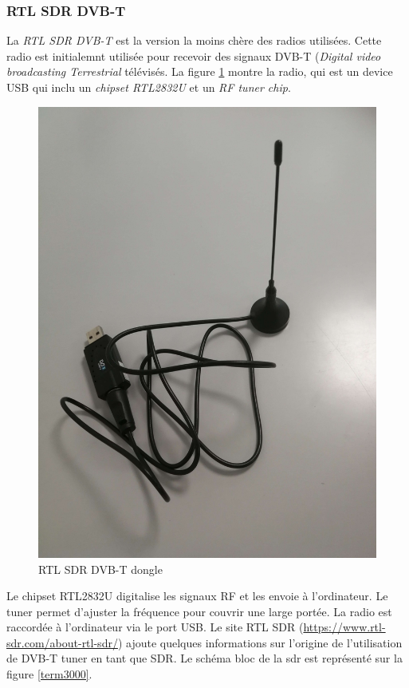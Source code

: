 \newpage

\subsubsection{RTL SDR DVB-T}\label{dvbt}

La \textit{RTL SDR DVB-T} est la version la moins chère des radios utilisées. Cette radio est initialemnt utilisée pour recevoir des signaux DVB-T (\textit{Digital video broadcasting Terrestrial} télévisés. La figure \ref{term31} montre la radio, qui est un device USB qui inclu un \textit{chipset RTL2832U} et un \textit{RF tuner chip}.

\begin{figure}[h]
\centering

\includegraphics[scale=0.08]{images/dvbt.png}
\caption{RTL SDR DVB-T dongle}\label{term31}
\end{figure}

Le chipset RTL2832U digitalise les signaux RF et les envoie à l'ordinateur. Le tuner permet d'ajuster la fréquence pour couvrir une large portée.
La radio est raccordée à l'ordinateur via le port USB. Le site RTL SDR (\href{https://www.rtl-sdr.com/about-rtl-sdr/}{https://www.rtl-sdr.com/about-rtl-sdr/}) ajoute quelques informations sur l'origine de l'utilisation de DVB-T tuner en tant que SDR. Le schéma bloc de la sdr est représenté sur la figure \ref{term3000}. 

